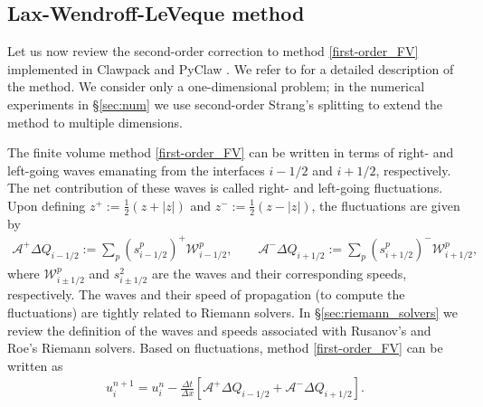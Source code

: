 \documentclass[preprint, 11pt]{article}
\newcommand{\W}{{\mathcal W}}
\newcommand{\A}{{\mathcal A}}
\begin{document}
\subsection{Lax-Wendroff-LeVeque method}\label{sec:lax-wendroff-leveque}
Let us now review the second-order correction to method \eqref{first-order_FV} implemented in 
Clawpack \cite{clawpack} and PyClaw \cite{pyclaw-sisc}.
We refer to \cite{leveque1997wave, leveque2002finite} for a detailed description of the method. 
We consider only a one-dimensional problem; in the 
numerical experiments in \S\ref{sec:num} we use second-order Strang's splitting \cite{strang1968construction} 
to extend the method to multiple dimensions. 

The finite volume method \eqref{first-order_FV} can be written in terms of right- 
and left-going waves emanating from the interfaces $i-1/2$ and $i+1/2$, respectively. 
The net contribution of these waves is called right- and left-going fluctuations. 
Upon defining $z^+:=\frac{1}{2}(z+|z|)$ and $z^-:=\frac{1}{2}(z-|z|)$, 
the fluctuations are given by
\begin{align}\label{fluct}
  \A^+\Delta Q_{i-1/2} := \sum_p\left(s_{i-1/2}^p\right)^+\W_{i-1/2}^p, \qquad
  \A^-\Delta Q_{i+1/2} := \sum_p\left(s_{i+1/2}^p\right)^-\W_{i+1/2}^p,
\end{align}
where $\W_{i\pm 1/2}^p$ and $s_{i\pm 1/2}^2$ are the waves and their corresponding speeds, respectively. 
The waves and their speed of propagation (to compute the fluctuations) are tightly related to Riemann solvers. 
In \S\ref{sec:riemann_solvers} we review the definition of the waves and speeds associated with 
Rusanov's and Roe's Riemann solvers.
Based on fluctuations, method \eqref{first-order_FV} can be written as 
\begin{align}\label{first-order_via_fluct}
  u_i^{n+1}=u_i^n-\frac{\Delta t}{\Delta x}\left[\A^+\Delta Q_{i-1/2}+\A^-\Delta Q_{i+1/2}\right].
\end{align}
\end{document}
